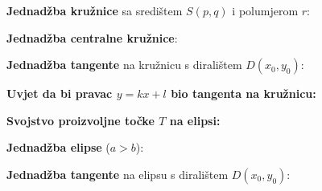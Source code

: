 \documentclass[9pt,oneside,a4paper]{report}
\begin{document}
\vspace{3mm}
\noindent
{}

\vspace{3mm}
\noindent
\textbf{Jednad\v{z}ba kru\v{z}nice} sa sredi\v{s}tem $S(p,q)$ i polumjerom $r$:\\ \hspace*{25mm}

\vspace{3mm}
\noindent \textbf{Jednad\v{z}ba centralne kru\v{z}nice}:\hspace{5mm}

\noindent
\textbf{Jednad\v{z}ba tangente} na kru\v{z}nicu s dirali\v{s}tem
$D(x_0,y_0)$: \hspace*{5mm}

\vspace{1mm}
\noindent
\textbf{Uvjet da bi pravac $y=kx+l$ bio tangenta na kru\v{z}nicu:}
\hspace{5mm}

\vspace{5mm}
\begin{floatingfigure}[r]{7cm}
\end{floatingfigure}

\vspace{3mm}
\noindent
{}

\vspace{3mm}\noindent
\textbf{Svojstvo proizvoljne to\v{c}ke $T$ na elipsi:}\\
\hspace*{20mm}


\vspace{3mm}\noindent
\textbf{Jednad\v{z}ba elipse} ($a>b$):\\
\hspace*{10mm}
\hspace*{5mm}

\vspace{3mm}\noindent
\noindent
\textbf{Jednad\v{z}ba tangente} na elipsu s dirali\v{s}tem
$D(x_0,y_0)$:\\
\hspace*{20mm}
\end{document}
